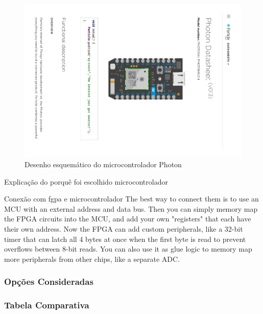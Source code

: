	\begin{figure}[htb]
		\caption{\label{fig_photon} Desenho esquemático do microcontrolador Photon}
		\begin{center}
			\includegraphics[width=0.5\textheight, trim={11.7cm 7.9cm 7.8cm 7.4cm}, clip]{photon.pdf}
		\end{center}
	\end{figure}

	
	Explicação do porquê foi escolhido microcontrolador
	
	Conexão com fgpa e microcontrolador
	The best way to connect them is to use an MCU with an external address and data bus. Then you can simply memory map the FPGA circuits into the MCU, and add your own "registers" that each have their own address. Now the FPGA can add custom peripherals, like a 32-bit timer that can latch all 4 bytes at once when the first byte is read to prevent overflows between 8-bit reads. You can also use it as glue logic to memory map more peripherals from other chips, like a separate ADC.
	
	
	\subsubsection{Opções Consideradas}\label{uc-options}
	
	\subsubsection{Tabela Comparativa}\label{uc-table}
	

